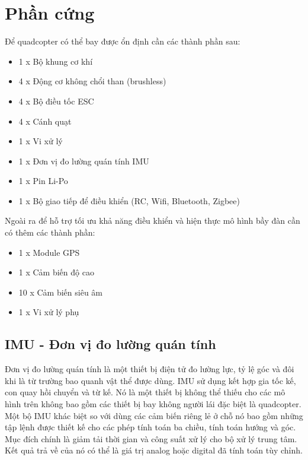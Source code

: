 \section{Phần cứng} 
	Để quadcopter có thể bay được ổn định cần các thành phần sau:
	\begin{itemize}
    	\item 1 x Bộ khung cơ khí
    	\item 4 x Động cơ không chổi than (brushless)
    	\item 4 x Bộ điều tốc ESC
    	\item 4 x Cánh quạt
    	\item 1 x Vi xử lý
    	\item 1 x Đơn vị đo lường quán tính IMU
    	\item 1 x Pin Li-Po
    	\item 1 x Bộ giao tiếp để điều khiển (RC, Wifi, Bluetooth, Zigbee)
    \end{itemize}
    Ngoài ra để hỗ trợ tối ưu khả năng điều khiển và hiện thực mô hình bầy đàn cần có thêm các thành phần:
    \begin{itemize}
    	\item 1 x Module GPS
    	\item 1 x Cảm biến độ cao
    	\item 10 x Cảm biến siêu âm
    	\item 1 x Vi xử lý phụ
    \end{itemize}
    \subsection{IMU - Đơn vị đo lường quán tính}
    Đơn vị đo lường quán tính là một thiết bị điện tử đo lường lực, tỷ lệ góc và đôi khi là từ trường bao quanh vật thể được dùng. IMU sử dụng kết hợp gia tốc kế, con quay hồi chuyển và từ kế. Nó là một thiết bị không thể thiếu cho các mô hình trên không bao gồm các thiết bị bay không người lái đặc biệt là quadcopter.\\
    Một bộ IMU khác biệt so với dùng các cảm biến riêng lẻ ở chỗ nó bao gồm những tập lệnh được thiết kế cho các phép tính toán ba chiều, tính toán hướng và góc. Mục đích chính là giảm tải thời gian và công suất xử lý cho bộ xử lý trung tâm. Kết quả trả về của nó có thể là giá trị analog hoặc digital đã tính toán tùy chỉnh.
    
